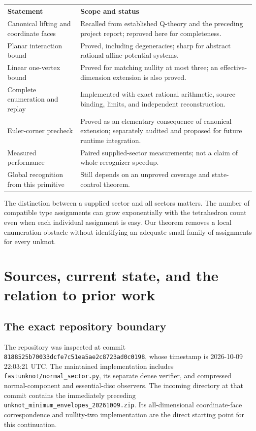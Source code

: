 \documentclass[11pt,letterpaper]{article}
\theoremstyle{definition}
\theoremstyle{remark}\newtheorem{remark}[theorem]{Remark}
\newcommand{\code}[1]{\nolinkurl{#1}}
\newcommand{\basecommit}{\nolinkurl{8188525b70033dcfe7c51ea5ae2c8723ad0c0198}}
\begin{document}
\begin{center}
\begin{tabularx}{\linewidth}{@{}>{\raggedright\arraybackslash}p{.25\linewidth}X@{}}
\toprule
Statement & Scope and status \\
\midrule
Canonical lifting and coordinate faces & Recalled from established Q-theory
and the preceding project report; reproved here for completeness.\\
Planar interaction bound & Proved, including degeneracies; sharp for abstract
rational affine-potential systems.\\
Linear one-vertex bound & Proved for matching nullity at most three; an
effective-dimension extension is also proved.\\
Complete enumeration and replay & Implemented with exact rational arithmetic,
source binding, limits, and independent reconstruction.\\
Euler-corner precheck & Proved as an elementary consequence of canonical
extension; separately audited and proposed for future runtime integration.\\
Measured performance & Paired supplied-sector measurements; not a claim of
whole-recognizer speedup.\\
Global recognition from this primitive & Still depends on an unproved
coverage and state-control theorem.\\
\bottomrule
\end{tabularx}
\end{center}

The distinction between a supplied sector and all sectors matters. The
number of compatible type assignments can grow exponentially with the
tetrahedron count even when each individual assignment is easy. Our theorem
removes a local enumeration obstacle without identifying an adequate small
family of assignments for every unknot.

\section{Sources, current state, and the relation to prior work}
\label{sec:sources}

\subsection{The exact repository boundary}

The repository was inspected at commit \basecommit, whose timestamp is
2026-10-09 22:03:21 UTC. The maintained implementation includes
\code{fastunknot/normal_sector.py}, its separate dense verifier,
and compressed normal-component and essential-disc observers. The incoming
directory at that commit contains the immediately preceding
\code{unknot_minimum_envelopes_20261009.zip}. Its all-dimensional
coordinate-face correspondence and nullity-two implementation are the direct
starting point for this continuation.
\end{document}
